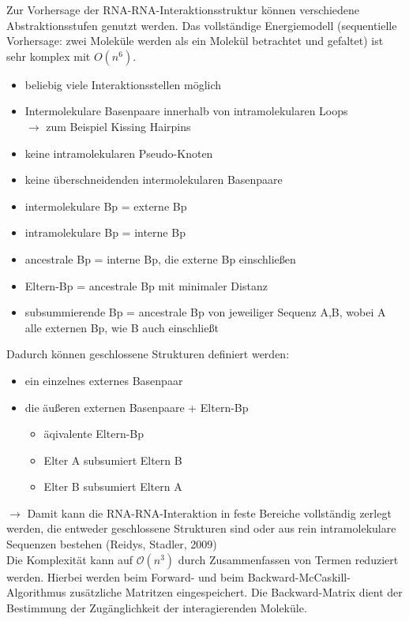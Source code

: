 Zur Vorhersage der RNA-RNA-Interaktionsstruktur können verschiedene Abstraktionsstufen genutzt werden. Das vollständige Energiemodell (sequentielle Vorhersage: zwei Moleküle werden als ein Molekül betrachtet und gefaltet) ist sehr komplex mit $O(n^6)$.
\begin{itemize}
\item beliebig viele Interaktionsstellen möglich
\item Intermolekulare Basenpaare innerhalb von intramolekularen Loops \\ $\rightarrow$ zum Beispiel Kissing Hairpins 
\item keine intramolekularen Pseudo-Knoten
\item keine überschneidenden intermolekularen Basenpaare \\
\item intermolekulare Bp = externe Bp
\item intramolekulare Bp = interne Bp
\item ancestrale Bp = interne Bp, die externe Bp einschließen
\item Eltern-Bp = ancestrale Bp mit minimaler Distanz
\item subsummierende Bp = ancestrale Bp von jeweiliger Sequenz A,B, wobei A alle externen Bp, wie B auch einschließt
\end{itemize}

Dadurch können geschlossene Strukturen definiert werden:
\begin{itemize}
\item ein einzelnes externes Basenpaar
\item die äußeren externen Basenpaare + Eltern-Bp 
\begin{itemize}
\item äqivalente Eltern-Bp
\item Elter A subsumiert Eltern B
\item Elter B subsumiert Eltern A
\end{itemize}
\end{itemize}
$\rightarrow$ Damit kann die RNA-RNA-Interaktion in feste Bereiche vollständig zerlegt werden, die entweder geschlossene Strukturen sind oder aus rein intramolekulare Sequenzen bestehen (Reidys, Stadler, 2009) \\

Die Komplexität kann auf $\mathcal{O}(n^3)$ durch Zusammenfassen von Termen reduziert werden. Hierbei werden beim Forward- und beim Backward-McCaskill-Algorithmus zusätzliche Matritzen eingespeichert. Die Backward-Matrix dient der Bestimmung der Zugänglichkeit der interagierenden Moleküle.
